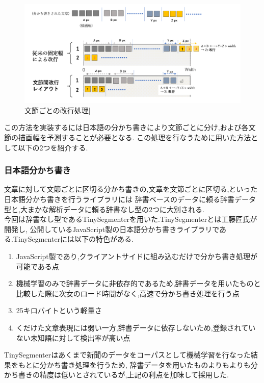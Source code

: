 \begin{figure}[H]
    \centering
    \label{fig:image14}
    \includegraphics[width=0.6\columnwidth]{image/03/img6.png}
	\caption[文節ごとの改行処理]{文節ごとの改行処理]}
\end{figure}

この方法を実装するには日本語の分かち書きにより文節ごとに分け,および各文節の描画幅を予測することが必要となる.
この処理を行なうために用いた方法として以下の2つを紹介する.

\subsubsection{日本語分かち書き}
文章に対して文節ごとに区切る分かち書きの,文章を文節ごとに区切る,といった日本語分かち書きを行うライブラリには
辞書ベースのデータに頼る辞書データ型と,大まかな解析データに頼る辞書なし型の2つに大別される.
\\今回は辞書なし型であるTinySegmenterを用いた.TinySegmenterとは工藤匠氏が開発し,
公開しているJavaScript製の日本語分かち書きライブラリである.\footnotemark[2]
TinySegmenterには以下の特色がある.

\begin{enumerate}
	\item JavaScript製であり,クライアントサイドに組み込むだけで分かち書き処理が可能である点
	\item 機械学習のみで辞書データに非依存的であるため,辞書データを用いたものと比較した際に次女のロード時間がなく,高速で分かち書き処理を行う点
	\item 25キロバイトという軽量さ
	\item くだけた文章表現には弱い一方,辞書データに依存しないため,登録されていない未知語に対して検出率が高い点
\end{enumerate}
TinySegmenterはあくまで新聞のデータをコーパスとして機械学習を行なった結果をもとに分かち書き処理を行うため,
辞書データを用いたものよりもよりも分かち書きの精度は低いとされているが,上記の利点を加味して採用した.


